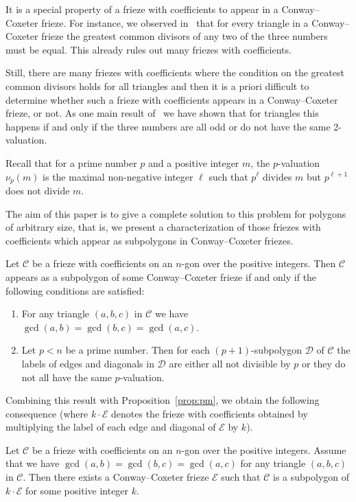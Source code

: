 \documentclass[ALCO,ThmDefs,Unicode,epreuves,published]{cedram}
\numberwithin{equation}{section}
\begin{document}
It is a special property of a frieze with coefficients to appear in a Conway--Coxeter
frieze. For instance, we observed in~\cite{CHJ} that for every triangle in
a Conway--Coxeter frieze the greatest common divisors of any two of the three 
numbers must be equal. This already rules out many friezes with coefficients. 

Still, there are many friezes with coefficients where the condition on the greatest
common divisors holds for all triangles and then it is a priori difficult to
determine whether such a frieze with coefficients appears in a Conway--Coxeter
frieze, or not. As one main result of~\cite{CHJ} we have shown that for triangles 
this happens if and only if the three numbers are all odd or do not have the 
same 2-valuation. 

Recall that for a prime number $p$ and a positive integer $m$, the $p$-valuation 
$\nu_p(m)$ is the maximal non-negative integer $\ell$ such that $p^{\ell}$ divides $m$
but $p^{\ell+1}$ does not divide $m$.

The aim of this paper is to give a complete solution to this problem for polygons of
arbitrary size, that is, we present a 
characterization of those friezes with coefficients which appear as subpolygons 
in Conway--Coxeter friezes. 

\begin{theo*}
Let $\mathcal{C}$ be a frieze with coefficients 
on an $n$-gon over the positive integers. Then $\mathcal{C}$ appears as a subpolygon
of some Conway--Coxeter frieze if and only if the following conditions are
satisfied:
\begin{enumerate}
\item \label{cond0:gcd}
For any triangle $(a,b,c)$ in $\mathcal{C}$ we have
$\gcd(a,b)=\gcd(b,c)=\gcd(a,c)$.
\item \label{cond0:p+1}
Let $p<n$ be a prime number. Then for each $(p+1)$-subpolygon $\mathcal{D}$
of $\mathcal{C}$ the labels of edges and diagonals in $\mathcal{D}$ are either
all not divisible by $p$ or they do not all have the same $p$-valuation.
\end{enumerate}
\end{theo*}

Combining this result with Proposition~\ref{prop:pm}, we obtain the following 
consequence (where $k\cdot \mathcal{E}$ denotes the frieze with coefficients
obtained by multiplying the label of each edge and diagonal 
of $\mathcal{E}$ by $k$).

\begin{coro*}
Let $\mathcal{C}$ be a frieze with coefficients on an $n$-gon over the positive integers.
Assume that we have $\gcd(a,b)=\gcd(b,c)=\gcd(a,c)$ for any triangle $(a,b,c)$ in $\mathcal{C}$.
Then there exists a Conway--Coxeter frieze $\mathcal{E}$ such that $\mathcal{C}$ is a subpolygon of $k\cdot \mathcal{E}$ for some positive integer $k$.
\end{coro*}
\end{document}
